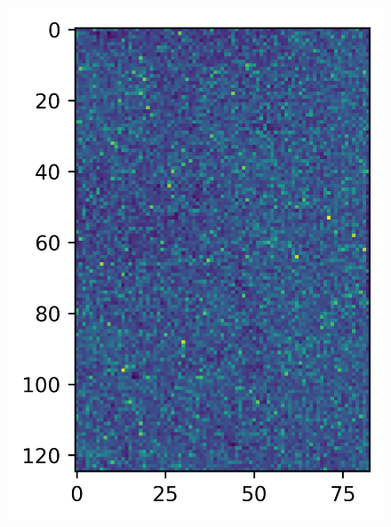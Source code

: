 \begin{figure}
\begin{multicols}{2}
    \includegraphics[width=\linewidth]{Graphics/mm-vertical.png}\par

\end{multicols}
\end{figure}
